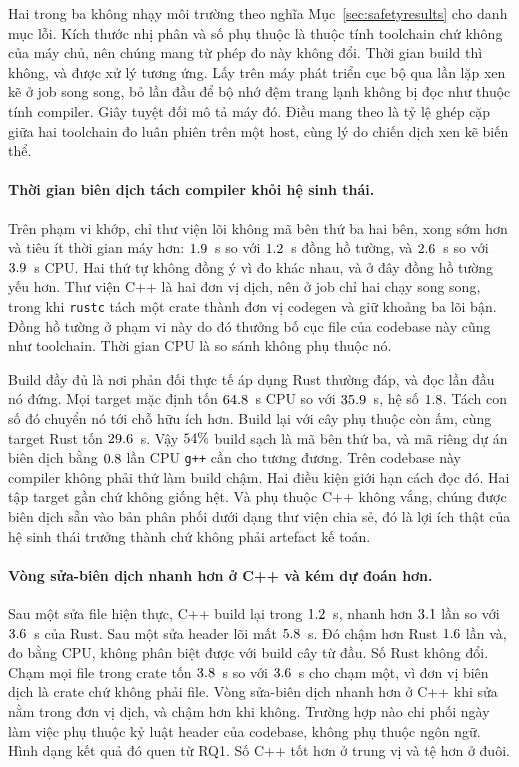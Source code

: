 Hai trong ba không nhạy môi trường theo nghĩa
Mục~\ref{sec:safetyresults} cho danh mục lỗi. Kích thước nhị phân và số phụ thuộc là
thuộc tính toolchain chứ không của máy chủ, nên chúng mang từ phép đo
này không đổi. Thời gian build thì không, và được xử lý tương ứng. Lấy trên máy phát triển cục bộ qua \AdoptRepeats{} lần lặp xen kẽ ở \AdoptJobs{} job song song, bỏ
lần đầu để bộ nhớ đệm trang lạnh không bị đọc như thuộc tính compiler. Giây
tuyệt đối mô tả máy đó. Điều mang theo là tỷ lệ ghép cặp giữa hai toolchain đo
luân phiên trên một host, cùng lý do chiến dịch xen kẽ biến thể.

\paragraph{Thời gian biên dịch tách compiler khỏi hệ sinh thái.}
Trên phạm vi khớp, chỉ thư viện lõi không mã bên thứ ba hai bên,
\BuildLibWallFaster{} xong sớm hơn và \BuildLibCpuCheaper{} tiêu ít thời gian máy hơn:
$1.9$~s so với $1.2$~s đồng hồ tường, và $2.6$~s so với
$3.9$~s CPU. Hai thứ tự không đồng ý vì đo khác nhau,
và ở đây đồng hồ tường yếu hơn. Thư viện C++ là hai đơn vị dịch, nên ở
\AdoptJobs{} job chỉ hai chạy song song, trong khi \texttt{rustc} tách một crate thành
đơn vị codegen và giữ khoảng ba lõi bận. Đồng hồ tường ở phạm vi này do đó thưởng
bố cục file của codebase này cũng như toolchain. Thời gian CPU là so sánh
không phụ thuộc nó.

Build đầy đủ là nơi phản đối thực tế áp dụng Rust thường đáp, và đọc lần đầu
nó đứng. Mọi target mặc định tốn $64.8$~s CPU so với
$35.9$~s, hệ số $1.8$. Tách con số đó chuyển nó tới
chỗ hữu ích hơn. Build lại với cây phụ thuộc còn ấm, cùng target Rust tốn
$29.6$~s. Vậy $54\%$ build sạch là mã bên thứ ba, và
mã riêng dự án biên dịch bằng $0.8$ lần CPU \texttt{g++} cần
cho tương đương. Trên codebase này compiler không phải thứ làm build chậm. Hai
điều kiện giới hạn cách đọc đó. Hai tập target gần chứ không giống hệt. Và phụ thuộc C++
không vắng, chúng được biên dịch sẵn vào bản phân phối dưới dạng thư viện chia sẻ, đó là
lợi ích thật của hệ sinh thái trưởng thành chứ không phải artefact kế toán.

\paragraph{Vòng sửa-biên dịch nhanh hơn ở C++ và kém dự đoán hơn.}
Sau một sửa file hiện thực, C++ build lại trong $1.2$~s, nhanh hơn
$3.1$ lần so với $3.6$~s của Rust. Sau một sửa header lõi
mất $5.8$~s. Đó chậm hơn Rust $1.6$ lần và, đo
bằng CPU, không phân biệt được với build cây từ đầu. Số Rust không đổi.
Chạm mọi file trong crate tốn $3.8$~s so với $3.6$~s cho
chạm một, vì đơn vị biên dịch là crate chứ không phải file. Vòng sửa-biên dịch
nhanh hơn ở C++ khi sửa nằm trong đơn vị dịch, và chậm hơn khi không. Trường hợp nào chi phối ngày làm việc phụ thuộc kỷ luật header của codebase, không phụ thuộc
ngôn ngữ. Hình dạng kết quả đó quen từ RQ1. Số C++ tốt hơn ở
trung vị và tệ hơn ở đuôi.

